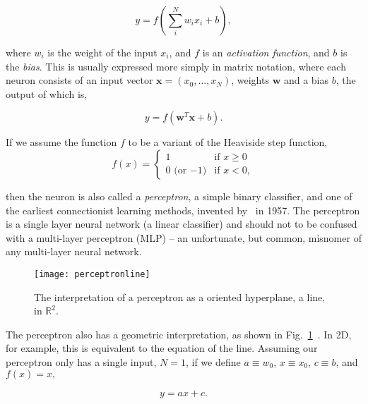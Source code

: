\documentclass[thesis]{subfiles}
\begin{document}
\begin{equation}
	y = f\left(\sum_{i}^{N} w_i x_i + b\right),
\end{equation}

where $w_i$ is the weight of the input $x_i$, and $f$ is an \emph{activation function}, and $b$ is the \emph{bias}. This is usually expressed more simply in matrix notation, where each neuron consists of an input vector $\mathbf{x}=(x_0,\ldots,x_N)$, weights $\mathbf{w}$ and a bias $b$, the output of which is, %

\begin{equation}
    y = f\left(\mathbf{w}^T\mathbf{x} + b \right).
\end{equation}

If we assume the function $f$ to be a variant of the Heaviside step function,
\begin{equation}
    f(x) = 
\begin{cases}
1 & \text{if } x \geq 0\\
0 \textrm{ (or $-1$)} & \text{if } x < 0,
\end{cases}
\end{equation}

then the neuron is also called a \emph{perceptron}, a simple binary classifier, and one of the earliest connectionist learning methods, invented by~\citet{rosenblatt1958perceptron} in 1957. The perceptron is a single layer neural network (\ie a linear classifier) and should not to be confused with a multi-layer perceptron (MLP) -- an unfortunate, but common, misnomer of any multi-layer neural network.
\begin{figure}[tbp]
\centering
\texttt{[image: perceptronline]}
\caption[The interpretation of a perceptron as a hyperplane]{The interpretation of a perceptron as a oriented hyperplane, \ie a line, in $\mathbb{R}^2$.}
\label{fig:hyperplane}
\end{figure}
The perceptron also has a geometric interpretation, as shown in Fig.~\ref{fig:hyperplane}~\citet{Bishop1995}. In 2D, for example, this is equivalent to the equation of the line. Assuming our perceptron only has a single input, \ie $N=1$, if we define $a\equiv w_0$, $x \equiv x_0$, $c \equiv b$, and $f(x) = x,$

\begin{equation}
y = a x + c.
\end{equation}
\end{document}

